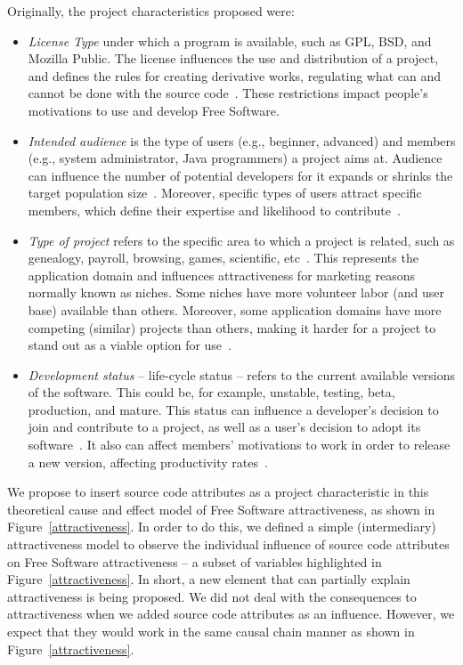 \documentclass[conference]{IEEEtran}
\begin{document}
Originally, the project characteristics proposed were:
\begin{itemize}
%
\item \emph{License Type} under which a program is available, such as GPL, BSD, 
and Mozilla Public.
%
The license influences the use and distribution of a project, and defines the rules for 
creating derivative works, regulating what can and cannot be done with the
source code~\cite{Santos2010}. These restrictions impact people's motivations
to use and develop Free Software.

%
\item \emph{Intended audience} is the type of users (e.g., beginner, advanced)
and members (e.g., system administrator, Java programmers) a project aims at.
%
Audience can influence the number of potential developers for it expands or
shrinks the target population size~\cite{johnson2002}.
%
Moreover, specific types of users attract specific members, which define their expertise
and likelihood to contribute~\cite{Santos2010}.

%
\item \emph{Type of project} refers to the specific area to which a project is related, 
such as genealogy, payroll, browsing, games, scientific, etc~\cite{Crowston2002}.
%
This represents the application domain and influences attractiveness for
marketing reasons normally known as niches.
%
Some niches have more volunteer labor (and user base) available than others.
%
Moreover, some application domains have more competing (similar) projects than
others, making it harder for a project to stand out as a viable option for
use~\cite{johnson2002}.
%
\item \emph{Development status} -- life-cycle status -- refers to the current 
available versions of the software. 
%
This could be, for example, unstable, testing, beta, production, and mature.
%
This status can influence a developer's decision to join and contribute to a
project, as well as a user's decision to adopt its software~\cite{Santos2010}.
%
It also can affect members' motivations to work in order to release a new version,
affecting productivity rates~\cite{raja2006,Stewart2006}. 

\end{itemize}

We propose to insert source code attributes as a project
characteristic in this theoretical cause and effect model of Free Software
attractiveness, as shown in Figure~\ref{attractiveness}.
%
In order to do this, we defined a simple (intermediary) attractiveness model
to observe the individual influence of source code attributes on Free
Software attractiveness -- a subset of variables highlighted in
Figure~\ref{attractiveness}.
%
In short, a new element that can partially explain attractiveness is being proposed.
%
We did not deal with the consequences to attractiveness when we added source
code attributes as an influence.
%
However, we expect that they would work in the same causal chain manner
as shown in Figure~\ref{attractiveness}.
\end{document}
